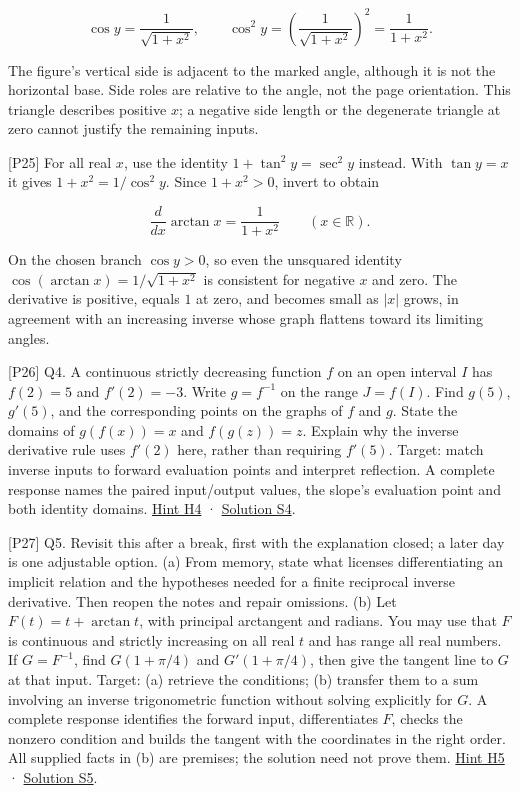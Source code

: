 \documentclass[
  11pt,
]{article}
\providecommand{\gt}{>}
\begin{document}
\[
\cos y=\frac{1}{\sqrt{1+x^2}},\qquad
\cos^2 y=\left(\frac{1}{\sqrt{1+x^2}}\right)^2
=\frac{1}{1+x^2}.
\]

The figure's vertical side is adjacent to the marked angle, although it
is not the horizontal base. Side roles are relative to the angle, not
the page orientation. This triangle describes positive \(x\); a negative
side length or the degenerate triangle at zero cannot justify the
remaining inputs.

{[}P25{]} For all real \(x\), use the identity \(1+\tan^2 y=\sec^2 y\)
instead. With \(\tan y=x\) it gives \(1+x^2=1/\cos^2 y\). Since
\(1+x^2\gt 0\), invert to obtain

\[
\frac{d}{dx}\arctan x=\frac1{1+x^2}\qquad(x\in\mathbb R).
\]

On the chosen branch \(\cos y\gt 0\), so even the unsquared identity
\(\cos(\arctan x)=1/\sqrt{1+x^2}\) is consistent for negative \(x\) and
zero. The derivative is positive, equals \(1\) at zero, and becomes
small as \(|x|\) grows, in agreement with an increasing inverse whose
graph flattens toward its limiting angles.

{[}P26{]} Q4. A continuous strictly decreasing function \(f\) on an open
interval \(I\) has \(f(2)=5\) and \(f'(2)=-3\). Write \(g=f^{-1}\) on
the range \(J=f(I)\). Find \(g(5)\), \(g'(5)\), and the corresponding
points on the graphs of \(f\) and \(g\). State the domains of
\(g(f(x))=x\) and \(f(g(z))=z\). Explain why the inverse derivative rule
uses \(f'(2)\) here, rather than requiring \(f'(5)\). Target: match
inverse inputs to forward evaluation points and interpret reflection. A
complete response names the paired input/output values, the slope's
evaluation point and both identity domains. \protect\hyperlink{h4}{Hint
H4} · \protect\hyperlink{s4}{Solution S4}.

{[}P27{]} Q5. Revisit this after a break, first with the explanation
closed; a later day is one adjustable option. (a) From memory, state
what licenses differentiating an implicit relation and the hypotheses
needed for a finite reciprocal inverse derivative. Then reopen the notes
and repair omissions. (b) Let \(F(t)=t+\arctan t\), with principal
arctangent and radians. You may use that \(F\) is continuous and
strictly increasing on all real \(t\) and has range all real numbers. If
\(G=F^{-1}\), find \(G(1+\pi/4)\) and \(G'(1+\pi/4)\), then give the
tangent line to \(G\) at that input. Target: (a) retrieve the
conditions; (b) transfer them to a sum involving an inverse
trigonometric function without solving explicitly for \(G\). A complete
response identifies the forward input, differentiates \(F\), checks the
nonzero condition and builds the tangent with the coordinates in the
right order. All supplied facts in (b) are premises; the solution need
not prove them. \protect\hyperlink{h5}{Hint H5} ·
\protect\hyperlink{s5}{Solution S5}.
\end{document}
